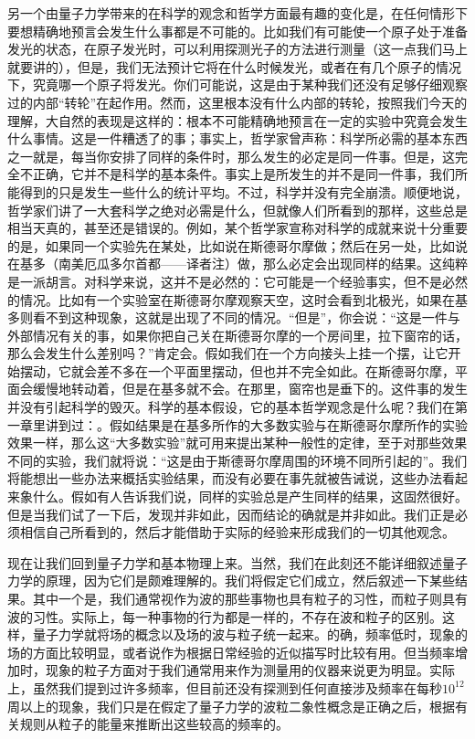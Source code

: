 另一个由量子力学带来的在科学的观念和哲学方面最有趣的变化是，在任何情形下要想精确地预言会发生什么事都是不可能的。比如我们有可能使一个原子处于准备发光的状态，在原子发光时，可以利用探测光子的方法进行测量（这一点我们马上就要讲的），但是，我们无法预计它将在什么时候发光，或者在有几个原子的情况下，究竟哪一个原子将发光。你们可能说，这是由于某种我们还没有足够仔细观察过的内部“转轮”在起作用。然而，这里根本没有什么内部的转轮，按照我们今天的理解，大自然的表现是这样的：根本不可能精确地预言在一定的实验中究竟会发生什么事情。这是一件糟透了的事；事实上，哲学家曾声称：科学所必需的基本东西之一就是，每当你安排了同样的条件时，那么发生的必定是同一件事。但是，这完全不正确，它并不是科学的基本条件。事实上是所发生的并不是同一件事，我们所能得到的只是发生一些什么的统计平均。不过，科学并没有完全崩溃。顺便地说，哲学家们讲了一大套科学之绝对必需是什么，但就像人们所看到的那样，这些总是相当天真的，甚至还是错误的。例如，某个哲学家宣称对科学的成就来说十分重要的是，如果同一个实验先在某处，比如说在斯德哥尔摩做；然后在另一处，比如说在基多（南美厄瓜多尔首都——译者注）做，那么必定会出现同样的结果。这纯粹是一派胡言。对科学来说，这并不是必然的：它可能是一个经验事实，但不是必然的情况。比如有一个实验室在斯德哥尔摩观察天空，这时会看到北极光，如果在基多则看不到这种现象，这就是出现了不同的情况。“但是”，你会说：“这是一件与外部情况有关的事，如果你把自己关在斯德哥尔摩的一个房间里，拉下窗帘的话，那么会发生什么差别吗？”肯定会。假如我们在一个方向接头上挂一个摆，让它开始摆动，它就会差不多在一个平面里摆动，但也并不完全如此。在斯德哥尔摩，平面会缓慢地转动着，但是在基多就不会。在那里，窗帘也是垂下的。这件事的发生并没有引起科学的毁灭。科学的基本假设，它的基本哲学观念是什么呢？我们在第一章里讲到过：。假如结果是在基多所作的大多数实验与在斯德哥尔摩所作的实验效果一样，那么这“大多数实验”就可用来提出某种一般性的定律，至于对那些效果不同的实验，我们就将说：“这是由于斯德哥尔摩周围的环境不同所引起的”。我们将能想出一些办法来概括实验结果，而没有必要在事先就被告诫说，这些办法看起来象什么。假如有人告诉我们说，同样的实验总是产生同样的结果，这固然很好。但是当我们试了一下后，发现并非如此，因而结论的确就是并非如此。我们正是必须相信自己所看到的，然后才能借助于实际的经验来形成我们的一切其他观念。

现在让我们回到量子力学和基本物理上来。当然，我们在此刻还不能详细叙述量子力学的原理，因为它们是颇难理解的。我们将假定它们成立，然后叙述一下某些结果。其中一个是，我们通常视作为波的那些事物也具有粒子的习性，而粒子则具有波的习性。实际上，每一种事物的行为都是一样的，不存在波和粒子的区别。这样，量子力学就将场的概念以及场的波与粒子统一起来。的确，频率低时，现象的场的方面比较明显，或者说作为根据日常经验的近似描写时比较有用。但当频率增加时，现象的粒子方面对于我们通常用来作为测量用的仪器来说更为明显。实际上，虽然我们提到过许多频率，但目前还没有探测到任何直接涉及频率在每秒$10^{12}$周以上的现象，我们只是在假定了量子力学的波粒二象性概念是正确之后，根据有关规则从粒子的能量来推断出这些较高的频率的。

